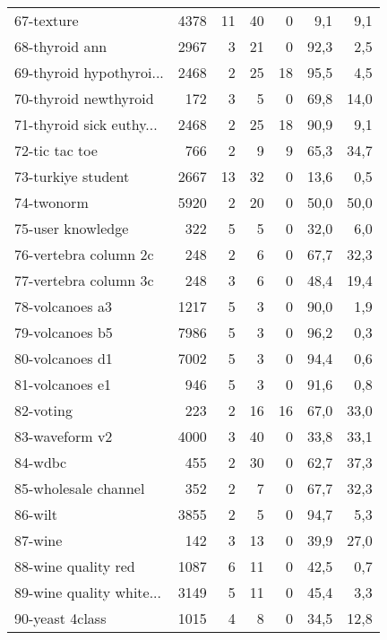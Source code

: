\begin{table}[h]
\begin{center}
{\begin{tabular}{lr r r r r r}
67-texture & 4378 & 11 & 40 & 0 & 9,1 & 9,1\\
68-thyroid ann & 2967 & 3 & 21 & 0 & 92,3 & 2,5\\
69-thyroid hypothyroi... & 2468 & 2 & 25 & 18 & 95,5 & 4,5\\
70-thyroid newthyroid & 172 & 3 & 5 & 0 & 69,8 & 14,0\\
71-thyroid sick euthy... & 2468 & 2 & 25 & 18 & 90,9 & 9,1\\
72-tic tac toe & 766 & 2 & 9 & 9 & 65,3 & 34,7\\
73-turkiye student & 2667 & 13 & 32 & 0 & 13,6 & 0,5\\
74-twonorm & 5920 & 2 & 20 & 0 & 50,0 & 50,0\\
75-user knowledge & 322 & 5 & 5 & 0 & 32,0 & 6,0\\
76-vertebra column 2c & 248 & 2 & 6 & 0 & 67,7 & 32,3\\
77-vertebra column 3c & 248 & 3 & 6 & 0 & 48,4 & 19,4\\
78-volcanoes a3 & 1217 & 5 & 3 & 0 & 90,0 & 1,9\\
79-volcanoes b5 & 7986 & 5 & 3 & 0 & 96,2 & 0,3\\
80-volcanoes d1 & 7002 & 5 & 3 & 0 & 94,4 & 0,6\\
81-volcanoes e1 & 946 & 5 & 3 & 0 & 91,6 & 0,8\\
82-voting & 223 & 2 & 16 & 16 & 67,0 & 33,0\\
83-waveform v2 & 4000 & 3 & 40 & 0 & 33,8 & 33,1\\
84-wdbc & 455 & 2 & 30 & 0 & 62,7 & 37,3\\
85-wholesale channel & 352 & 2 & 7 & 0 & 67,7 & 32,3\\
86-wilt & 3855 & 2 & 5 & 0 & 94,7 & 5,3\\
87-wine & 142 & 3 & 13 & 0 & 39,9 & 27,0\\
88-wine quality red & 1087 & 6 & 11 & 0 & 42,5 & 0,7\\
89-wine quality white... & 3149 & 5 & 11 & 0 & 45,4 & 3,3\\
90-yeast 4class & 1015 & 4 & 8 & 0 & 34,5 & 12,8\\
\bottomrule
\end{tabular}
}
\label{tab:datasetsb}
\end{center}
\end{table}